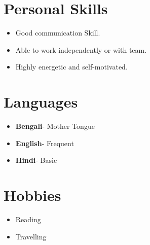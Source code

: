 \documentclass[12pt]{article}
\begin{document}
\section*{Personal Skills}
\begin{itemize}[leftmargin=0.5cm]
    \item Good communication Skill. \\
    \item Able to work independently or with team.\\
    \item Highly energetic and self-motivated.
\end{itemize}

\section*{Languages}
\begin{itemize}[leftmargin=0.5cm]
    \item \textbf{Bengali}- Mother Tongue
    \item \textbf{English}- Frequent
    \item \textbf{Hindi}- Basic
\end{itemize}

\section*{Hobbies}
\begin{itemize}[leftmargin=0.5cm]
    \item Reading 
    \item Travelling
\end{itemize}
\end{document}
